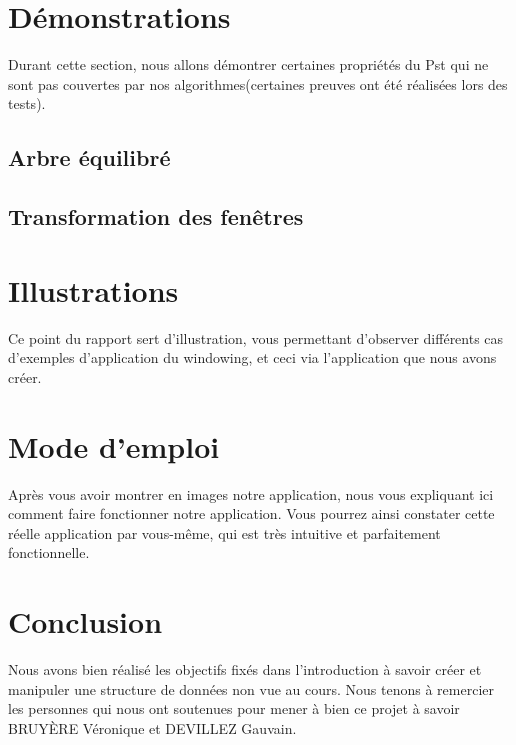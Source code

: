 \documentclass[10pt,a4paper]{article}
\begin{document}
\section{Démonstrations}
Durant cette section, nous allons démontrer certaines propriétés du Pst qui ne sont pas couvertes par nos algorithmes(certaines preuves ont été réalisées lors des tests).
\subsection{Arbre équilibré}

\subsection{Transformation des fenêtres}

\section{Illustrations}
Ce point du rapport sert d'illustration, vous permettant d'observer différents cas d'exemples d'application du windowing, et ceci via l'application que nous avons créer.

\section{Mode d'emploi}
Après vous avoir montrer en images notre application, nous vous expliquant ici comment faire fonctionner notre application. Vous pourrez ainsi constater cette réelle application par vous-même, qui est très intuitive et parfaitement fonctionnelle. 

\section{Conclusion}
Nous avons bien réalisé les objectifs fixés dans l'introduction à savoir créer et manipuler une structure de données non vue au cours. Nous tenons à remercier les personnes qui nous ont soutenues pour mener à bien ce projet à savoir BRUYÈRE Véronique et DEVILLEZ Gauvain.
\end{document}
